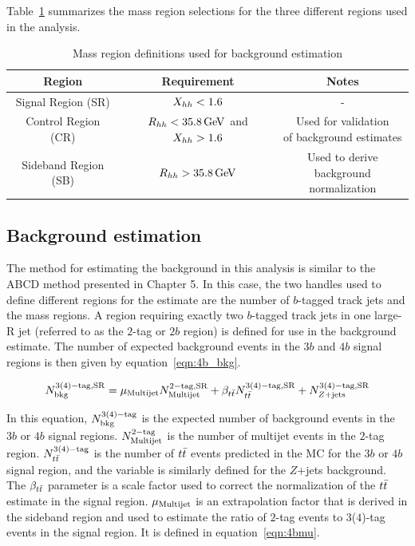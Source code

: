 Table~\ref{tab:MassRegions} summarizes the mass region selections for the three different regions used in the analysis.

\begin{table}[h!]
\centering
\captionsetup{justification=centering}

\hspace{-10pt}
\begin{tabular}{|c|c|c|}
\hline
Region & Requirement & Notes \\
\hline
Signal Region (SR) & $X_{hh} < 1.6$ & - \\ \hline
Control Region (CR) & $\Rhh < 35.8\GeV$ and $X_{hh} > 1.6$ & \specialcell{Used for validation\\of background estimates} \\ \hline
Sideband Region (SB) & $\Rhh > 35.8 \GeV$ & \specialcell{Used to derive\\background normalization} \\
\hline
\end{tabular}
\caption{
Mass region definitions used for background estimation
}
\label{tab:MassRegions}
\end{table}

\subsection{Background estimation}

The method for estimating the background in this analysis is similar to the ABCD method presented in Chapter 5. In this case, the two handles used to define different regions for the estimate are the number of $b$-tagged track jets and the mass regions. A region requiring exactly two $b$-tagged track jets in one large-R jet (referred to as the $2$-tag or $2b$ region) is defined for use in the background estimate. The number of expected background events in the $3b$ and $4b$ signal regions is then given by equation~\ref{eqn:4b_bkg}.

\begin{equation}
\label{eqn:4b_bkg}
N_{\rm bkg}^{\rm 3(4)-tag, SR} = \mu_{\rm Multijet} N_{\rm Multijet}^{\rm 2-tag, SR} + \beta_{t\bar{t}} N_{t\bar{t}}^{\rm 3(4)-tag, SR} + N_{Z+ \rm jets}^{\rm 3(4)-tag, SR}
\end{equation}

In this equation, $N_{\rm bkg}^{\rm 3(4)-tag}$ is the expected number of background events in the $3b$ or $4b$ signal regions. $N_{\rm Multijet}^{\rm 2-tag}$ is the number of multijet events in the $2$-tag region. $N_{t\bar{t}}^{\rm 3(4)-tag}$ is the number of $t\bar{t}$ events predicted in the MC for the $3b$ or $4b$ signal region, and the variable is similarly defined for the $Z$+jets background. The $\beta_{t\bar{t}}$ parameter is a scale factor used to correct the normalization of the $t\bar{t}$ estimate in the signal region. $\mu_{\rm Multijet}$ is an extrapolation factor that is derived in the sideband region and used to estimate the ratio of $2$-tag events to $3$($4$)-tag events in the signal region. It is defined in equation~\ref{eqn:4bmu}.


